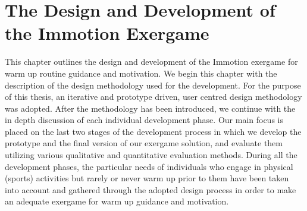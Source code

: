 \chapter{The Design and Development of the Immotion Exergame}\label{chapter:implementation}

This chapter outlines the design and development of the Immotion exergame for warm up routine guidance and motivation. We begin this chapter with the description of the design methodology used for the development. For the purpose of this thesis, an iterative and prototype driven, user centred design methodology was adopted. After the methodology has been introduced, we continue with the in depth discussion of each individual development phase. Our main focus is placed on the last two stages of the development process in which we develop the prototype and the final version of our exergame solution, and evaluate them utilizing various qualitative and quantitative evaluation methods. During all the development phases, the particular needs of individuals who engage in physical (sports) activities but rarely or never warm up prior to them have been taken into account and gathered through the adopted design process in order to make an adequate exergame for warm up guidance and motivation. %

